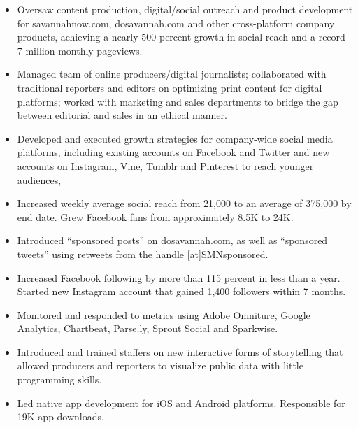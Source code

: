 \documentclass{article}
\begin{document}
\begin{itemize}[noitemsep,topsep=\mdcompacttopsep]
\begin{itemize}[noitemsep,topsep=\mdcompacttopsep]
\item{}Oversaw content production, digital/social outreach and product development for savannahnow.com, dosavannah.com and other cross-platform company products, achieving a nearly 500 percent growth in social reach and a record 7 million monthly pageviews.%

\item{}Managed team of online producers/digital journalists; collaborated with traditional reporters and editors on optimizing print content for digital platforms; worked with marketing and sales departments to bridge the gap between editorial and sales in an ethical manner.%

\item{}Developed and executed growth strategies for company-wide social media platforms, including existing accounts on Facebook and Twitter and new accounts on Instagram, Vine, Tumblr and Pinterest to reach younger audiences,%

\item{}Increased weekly average social reach from 21,000 to an average of 375,000 by end date. Grew Facebook fans from approximately 8.5K to 24K.%

\item{}Introduced \textquotedblleft{}sponsored posts\textquotedblright{} on dosavannah.com, as well as \textquotedblleft{}sponsored tweets\textquotedblright{} using retweets from the handle [at]SMNsponsored.%

\item{}Increased Facebook following by more than 115 percent in less than a year. Started new Instagram account that gained 1,400 followers within 7 months.%

\item{}Monitored and responded to metrics using Adobe Omniture, Google Analytics, Chartbeat, Parse.ly, Sprout Social and Sparkwise.%

\item{}Introduced and trained staffers on new interactive forms of storytelling that allowed producers and reporters to visualize public data with little programming skills.%

\item{}Led native app development for iOS and Android platforms. Responsible for 19K app downloads.%


\end{itemize}
\end{itemize}
\end{document}
